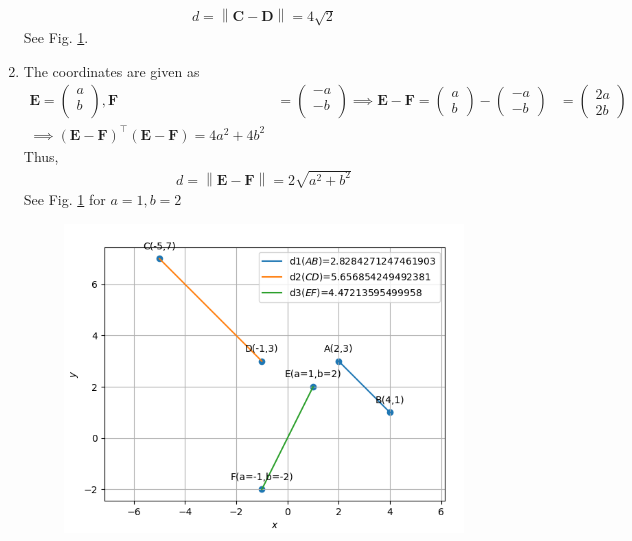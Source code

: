 \documentclass[12pt]{article}
\providecommand{\norm}[1]{\left\lVert#1\right\rVert}
\newcommand{\myvec}[1]{\ensuremath{\begin{pmatrix}#1\end{pmatrix}}}
\let\vec\mathbf
\begin{document}
\begin{enumerate}
\begin{align}
		d=\norm{\vec{C}-\vec{D}}
 =4\sqrt{2}
\end{align}	
	See Fig. \ref{fig:10/7/1/1Fig}.
%	
\item The coordinates are given as
	\begin{align}
	\vec{E} = \myvec{
		a\\
		b\\
		},
		\vec{F} &= \myvec{
		-a\\
		-b\\
		}
		\implies		\vec{E} - \vec{F} = \myvec{a\\b} - \myvec{-a\\-b} &= \myvec{2a\\2b}		
		\\
		\implies
		(\vec{E}-\vec{F})^\top (\vec{E}-\vec{F}) = 4a^2+4b^2 
	\end{align}
Thus,	
	\begin{align}
		d=\norm{\vec{E}-\vec{F}} =
2\sqrt{a^2+b^2}
\end{align}	
See  
Fig. \ref{fig:10/7/1/1Fig} for 
$ a=1,b=2$ 
\begin{figure}[!h]
	\begin{center} 
	    \includegraphics[width=\columnwidth]{chapters/10/7/1/1/figs/graph.png}
	\end{center}
\caption{}
\label{fig:10/7/1/1Fig}
\end{figure}
\end{enumerate}
\end{document}
